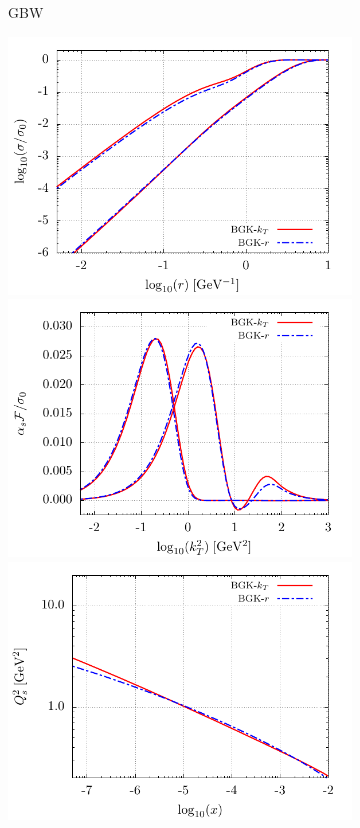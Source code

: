 \documentclass[11pt]{article}
\numberwithin{equation}{section}
\numberwithin{table}{section}
\numberwithin{figure}{section}
\begin{document}
\begin{figure}[p]
\begin{multicols}{2}
\begin{subfigure}{0.5\textwidth}
    \caption{GBW}
    \label{fig:GBW}
\end{subfigure}
\begin{subfigure}{0.5\textwidth}
    \includegraphics[width=\textwidth]{./plots/BGK-dipole.pdf}
    \includegraphics[width=\textwidth]{./plots/BGK-gluon.pdf}
    \includegraphics[width=\textwidth]{./plots/BGK-saturation.pdf}

\end{subfigure}
\end{multicols}
\end{figure}
\end{document}
